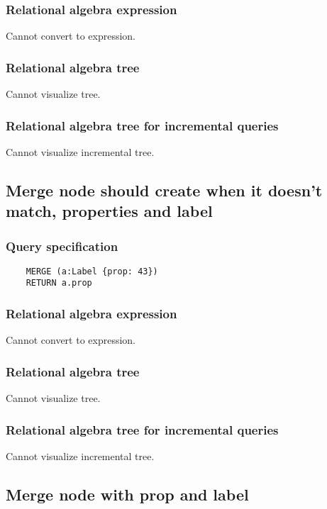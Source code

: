 	\subsubsection*{Relational algebra expression}

	Cannot convert to expression.

	\subsubsection*{Relational algebra tree}

	Cannot visualize tree.

	\subsubsection*{Relational algebra tree for incremental queries}

	Cannot visualize incremental tree.
	\subsection{Merge node should create when it doesn't match, properties and label}

	\subsubsection*{Query specification}

	\begin{lstlisting}
	MERGE (a:Label {prop: 43})
	RETURN a.prop
	\end{lstlisting}


	\subsubsection*{Relational algebra expression}

	Cannot convert to expression.

	\subsubsection*{Relational algebra tree}

	Cannot visualize tree.

	\subsubsection*{Relational algebra tree for incremental queries}

	Cannot visualize incremental tree.
	\subsection{Merge node with prop and label}

